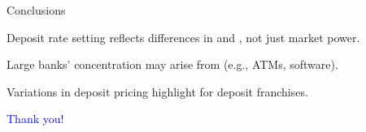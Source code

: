 \documentclass[notes,10pt, aspectratio=169]{beamer}
\newenvironment{wideitemize}{\itemize\addtolength{\itemsep}{10pt}}{\enditemize}
\begin{document}


\begin{frame}{Conclusions}
    \begin{wideitemize}
        \item Deposit rate setting reflects differences in  and , not just market power.  
        \item Large banks' concentration may arise from  (e.g., ATMs, software).  
        \item Variations in deposit pricing highlight  for deposit franchises.  
    \end{wideitemize}
\end{frame}

    

    \begin{frame}{}
        \centering
        \huge \textcolor{blue}{Thank you!}
    \end{frame}


    
\end{document}
